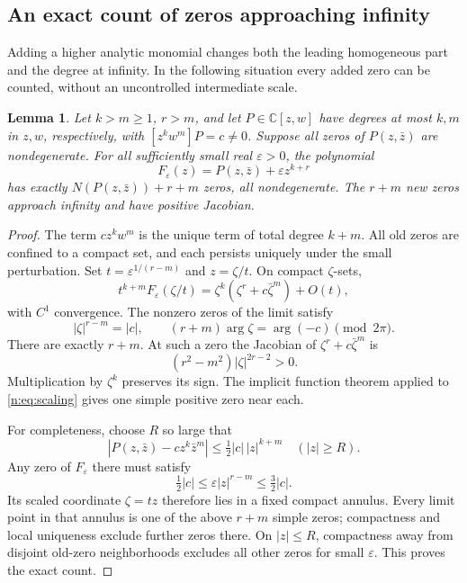 \documentclass[UTF8,11pt]{ctexart}
\newtheorem{lem}[thm]{Lemma}
\theoremstyle{definition}
\numberwithin{equation}{section}
\newcommand{\C}{\mathbb C}\newcommand{\R}{\mathbb R}
\begin{document}
\subsection{An exact count of zeros approaching infinity}\label{n:sec:infinity}
Adding a higher analytic monomial changes both the leading homogeneous part
and the degree at infinity. In the following situation every added zero
can be counted, without an uncontrolled intermediate scale.
\begin{lem}\label{n:lem:infinity}
Let $k>m\ge1$, $r>m$, and let $P\in\C[z,w]$ have degrees at most $k,m$
in $z,w$, respectively, with $[z^kw^m]P=c\ne0$. Suppose all zeros of
$P(z,\bar z)$ are nondegenerate. For all sufficiently small real
$\varepsilon>0$, the polynomial
\[
 F_\varepsilon(z)=P(z,\bar z)+\varepsilon z^{k+r}
\]
has exactly $N(P(z,\bar z))+r+m$ zeros, all nondegenerate. The $r+m$ new
zeros approach infinity and have positive Jacobian.
\end{lem}
\begin{proof}
The term $cz^kw^m$ is the unique term of total degree $k+m$. All old zeros
are confined to a compact set, and each persists uniquely under the small
perturbation. Set $t=\varepsilon^{1/(r-m)}$ and $z=\zeta/t$. On compact
$\zeta$-sets,
\begin{equation}\label{n:eq:scaling}
 t^{k+m}F_\varepsilon(\zeta/t)
 =\zeta^k(\zeta^r+c\bar\zeta^m)+O(t),
\end{equation}
with $C^1$ convergence. The nonzero zeros of the limit satisfy
\[
 |\zeta|^{r-m}=|c|,
 \qquad (r+m)\arg\zeta=\arg(-c)\pmod{2\pi}.
\]
There are exactly $r+m$. At such a zero the Jacobian of
$\zeta^r+c\bar\zeta^m$ is
\[
 (r^2-m^2)|\zeta|^{2r-2}>0.
\]
Multiplication by $\zeta^k$ preserves its sign. The implicit function theorem
applied to \eqref{n:eq:scaling} gives one simple positive zero near each.

For completeness, choose $R$ so large that
\[
 |P(z,\bar z)-cz^k\bar z^m|
 \le \tfrac12|c|\,|z|^{k+m}\quad (|z|\ge R).
\]
Any zero of $F_\varepsilon$ there must satisfy
\[
 \tfrac12|c|\le \varepsilon|z|^{r-m}\le\tfrac32|c|.
\]
Its scaled coordinate $\zeta=tz$ therefore lies in a fixed compact annulus.
Every limit point in that annulus is one of the above $r+m$ simple zeros;
compactness and local uniqueness exclude further zeros there.
On $|z|\le R$, compactness away from disjoint old-zero neighborhoods excludes
all other zeros for small $\varepsilon$. This proves the exact count.
\end{proof}
\end{document}
